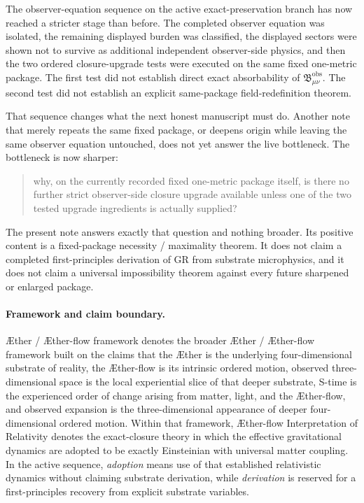\documentclass[11pt]{article}
\newcommand{\Aether}{\AE{}ther}
\newcommand{\Aflow}{\AE{}ther-flow}
\newcommand{\TheoryName}{\Aflow{} Interpretation of Relativity}
\newcommand{\TheoryProgram}{\Aether{} / \Aflow{} framework}
\newcommand{\ObsBurden}{\mathfrak B_{\mu\nu}^{\mathrm{obs}}}
\begin{document}
The observer-equation sequence on the active exact-preservation branch has now reached a stricter stage than before. The completed observer equation was isolated, the remaining displayed burden was classified, the displayed sectors were shown not to survive as additional independent observer-side physics, and then the two ordered closure-upgrade tests were executed on the same fixed one-metric package. The first test did not establish direct exact absorbability of \(\ObsBurden\). The second test did not establish an explicit same-package field-redefinition theorem.

That sequence changes what the next honest manuscript must do. Another note that merely repeats the same fixed package, or deepens origin while leaving the same observer equation untouched, does not yet answer the live bottleneck. The bottleneck is now sharper:
\begin{quote}
why, on the currently recorded fixed one-metric package itself, is there no further strict observer-side closure upgrade available unless one of the two tested upgrade ingredients is actually supplied?
\end{quote}
The present note answers exactly that question and nothing broader. Its positive content is a fixed-package necessity / maximality theorem. It does not claim a completed first-principles derivation of GR from substrate microphysics, and it does not claim a universal impossibility theorem against every future sharpened or enlarged package.

\paragraph{Framework and claim boundary.}
\TheoryProgram{} denotes the broader \Aether{} / \Aflow{} framework built on the claims that the \Aether{} is the underlying four-dimensional substrate of reality, the \Aflow{} is its intrinsic ordered motion, observed three-dimensional space is the local experiential slice of that deeper substrate, S-time is the experienced order of change arising from matter, light, and the \Aflow{}, and observed expansion is the three-dimensional appearance of deeper four-dimensional ordered motion. Within that framework, \TheoryName{} denotes the exact-closure theory in which the effective gravitational dynamics are adopted to be exactly Einsteinian with universal matter coupling. In the active sequence, \emph{adoption} means use of that established relativistic dynamics without claiming substrate derivation, while \emph{derivation} is reserved for a first-principles recovery from explicit substrate variables.
\end{document}
